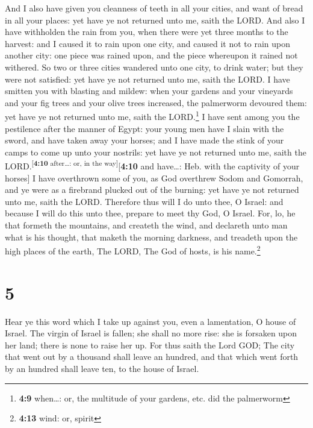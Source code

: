  And I also have given you cleanness of teeth in all your
cities, and want of bread in all your places: yet have ye not returned
unto me, saith the LORD.  And also I have withholden the
rain from you, when there were yet three months to the harvest: and I
caused it to rain upon one city, and caused it not to rain upon another
city: one piece was rained upon, and the piece whereupon it rained not
withered.  So two or three cities wandered unto one city,
to drink water; but they were not satisfied: yet have ye not returned
unto me, saith the LORD.  I have smitten you with blasting
and mildew: when your gardens and your vineyards and your fig trees and
your olive trees increased, the palmerworm devoured them: yet have ye
not returned unto me, saith the LORD.\footnote{\textbf{4:9} when\ldots:
  or, the multitude of your gardens, etc. did the palmerworm}
 I have sent among you the pestilence after the manner of
Egypt: your young men have I slain with the sword, and have taken away
your horses; and I have made the stink of your camps to come up unto
your nostrils: yet have ye not returned unto me, saith the
LORD.\textsuperscript{{[}\textbf{4:10} after\ldots: or, in the
way{]}}{[}\textbf{4:10} and have\ldots: Heb. with the captivity of your
horses{]}  I have overthrown some of you, as God
overthrew Sodom and Gomorrah, and ye were as a firebrand plucked out of
the burning: yet have ye not returned unto me, saith the LORD.
 Therefore thus will I do unto thee, O Israel: and
because I will do this unto thee, prepare to meet thy God, O Israel.
 For, lo, he that formeth the mountains, and createth the
wind, and declareth unto man what is his thought, that maketh the
morning darkness, and treadeth upon the high places of the earth, The
LORD, The God of hosts, is his name.\footnote{\textbf{4:13} wind: or,
  spirit}

\hypertarget{section-4}{%
\section{5}\label{section-4}}

 Hear ye this word which I take up against you, even a
lamentation, O house of Israel.  The virgin of Israel is
fallen; she shall no more rise: she is forsaken upon her land; there is
none to raise her up.  For thus saith the Lord GOD; The
city that went out by a thousand shall leave an hundred, and that which
went forth by an hundred shall leave ten, to the house of Israel.

